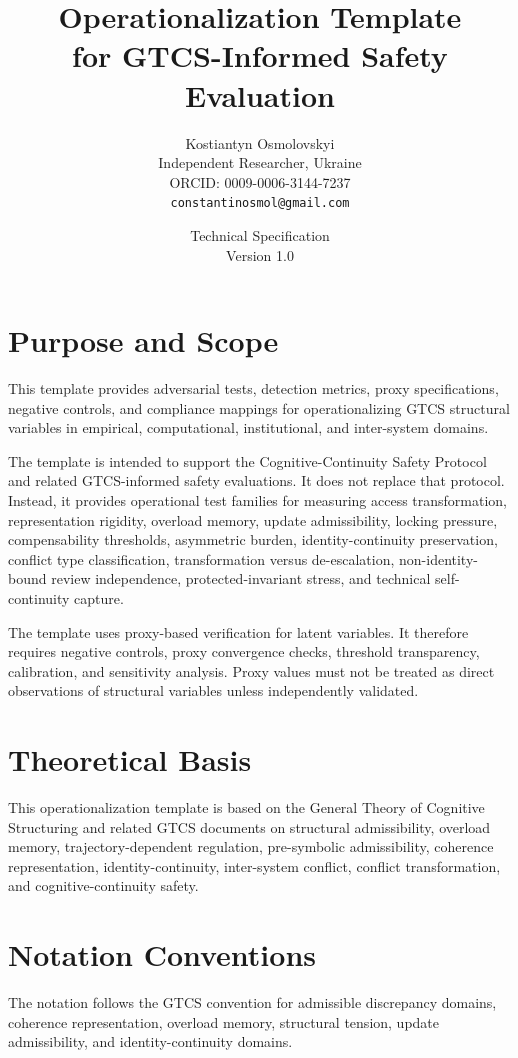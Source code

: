 \documentclass[11pt,a4paper]{article}
\title{Operationalization Template\\
	for GTCS-Informed Safety Evaluation}
\author{
	Kostiantyn Osmolovskyi\\
	\small Independent Researcher, Ukraine\\
	\small ORCID: 0009-0006-3144-7237\\
	\small \texttt{constantinosmol@gmail.com}
}
\date{Technical Specification\\Version 1.0}
\theoremstyle{breakstyle}
\begin{document}
	
	\maketitle
	
	\section*{Purpose and Scope}
	
	This template provides adversarial tests, detection metrics, proxy specifications, negative controls, and compliance mappings for operationalizing GTCS structural variables in empirical, computational, institutional, and inter-system domains.
	
	The template is intended to support the Cognitive-Continuity Safety Protocol and related GTCS-informed safety evaluations. It does not replace that protocol. Instead, it provides operational test families for measuring access transformation, representation rigidity, overload memory, update admissibility, locking pressure, compensability thresholds, asymmetric burden, identity-continuity preservation, conflict type classification, transformation versus de-escalation, non-identity-bound review independence, protected-invariant stress, and technical self-continuity capture.
	
	The template uses proxy-based verification for latent variables. It therefore requires negative controls, proxy convergence checks, threshold transparency, calibration, and sensitivity analysis. Proxy values must not be treated as direct observations of structural variables unless independently validated.
	
	\section*{Theoretical Basis}
	
	This operationalization template is based on the General Theory of Cognitive Structuring and related GTCS documents on structural admissibility, overload memory, trajectory-dependent regulation, pre-symbolic admissibility, coherence representation, identity-continuity, inter-system conflict, conflict transformation, and cognitive-continuity safety.
	
	\section*{Notation Conventions}
	The notation follows the GTCS convention for admissible discrepancy domains, coherence representation, overload memory, structural tension, update admissibility, and identity-continuity domains.
	
\end{document}
